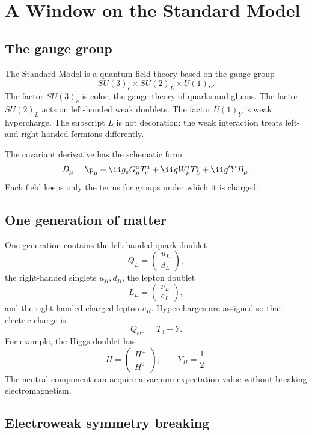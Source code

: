 \chapter{A Window on the Standard Model}

\section{The gauge group}

The Standard Model is a quantum field theory based on the gauge group
\[
  SU(3)_c\times SU(2)_L\times U(1)_Y.
\]
The factor \(SU(3)_c\) is color, the gauge theory of quarks and gluons.  The factor \(SU(2)_L\) acts on left-handed weak doublets.  The factor \(U(1)_Y\) is weak hypercharge.  The subscript \(L\) is not decoration: the weak interaction treats left- and right-handed fermions differently.

The covariant derivative has the schematic form
\[
  D_\mu
  =
  \p_\mu
  +\ii g_sG_\mu^aT_c^a
  +\ii g W_\mu^iT_L^i
  +\ii g'YB_\mu.
\]
Each field keeps only the terms for groups under which it is charged.

\section{One generation of matter}

One generation contains the left-handed quark doublet
\[
  Q_L=
  \begin{pmatrix}u_L\\ d_L\end{pmatrix},
\]
the right-handed singlets \(u_R,d_R\), the lepton doublet
\[
  L_L=
  \begin{pmatrix}\nu_L\\ e_L\end{pmatrix},
\]
and the right-handed charged lepton \(e_R\).  Hypercharges are assigned so that electric charge is
\[
  Q_{\text{em}}=T_3+Y.
\]
For example, the Higgs doublet has
\[
  H=
  \begin{pmatrix}H^+\\ H^0\end{pmatrix},
  \qquad Y_H=\frac12.
\]
The neutral component can acquire a vacuum expectation value without breaking electromagnetism.

\section{Electroweak symmetry breaking}

